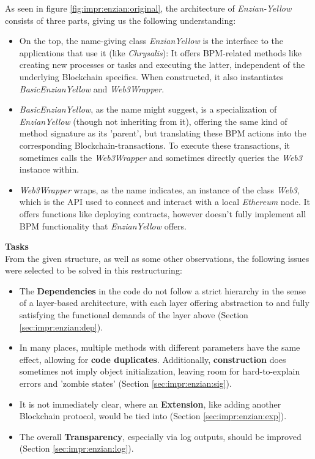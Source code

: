 As seen in figure \ref{fig:impr:enzian:original}, the architecture of \emph{Enzian-Yellow} consists of three parts, giving us the following understanding:
\begin{itemize}
    \item On the top, the name-giving class \emph{EnzianYellow} is the interface to the applications that use it (like \emph{Chrysalis}): It offers BPM-related methods like creating new processes or tasks and executing the latter, independent of the underlying Blockchain specifics. When constructed, it also instantiates \emph{BasicEnzianYellow} and \emph{Web3Wrapper}.
    \item \emph{BasicEnzianYellow}, as the name might suggest, is a specialization of \emph{EnzianYellow} (though not inheriting from it), offering the same kind of method signature as its 'parent', but translating these BPM actions into the corresponding Blockchain-transactions. To execute these transactions, it sometimes calls the \emph{Web3Wrapper} and sometimes directly queries the \emph{Web3} instance within.
    \item \emph{Web3Wrapper} wraps, as the name indicates, an instance of the class \emph{Web3}, which is the API used to connect and interact with a local \emph{Ethereum} node. It offers functions like deploying contracts, however doesn't fully implement all BPM functionality that \emph{EnzianYellow} offers.
\end{itemize}

\textbf{Tasks} \\[0.2em]
From the given structure, as well as some other observations, the following issues were selected to be solved in this restructuring:
\begin{itemize}
\nopagebreak
    \item The \textbf{Dependencies} in the code do not follow a strict hierarchy in the sense of a layer-based architecture, with each layer offering abstraction to and fully satisfying the functional demands of the layer above (Section \ref{sec:impr:enzian:dep}).
    \item In many places, multiple methods with different parameters have the same effect, allowing for \textbf{code duplicates}. Additionally, \textbf{construction} does sometimes not imply object initialization, leaving room for hard-to-explain errors and 'zombie states' (Section \ref{sec:impr:enzian:sig}).
    \item It is not immediately clear, where an \textbf{Extension}, like adding another Blockchain protocol, would be tied into (Section \ref{sec:impr:enzian:exp}). 
    \item The overall \textbf{Transparency}, especially via log outputs, should be improved (Section \ref{sec:impr:enzian:log}).
\end{itemize}

